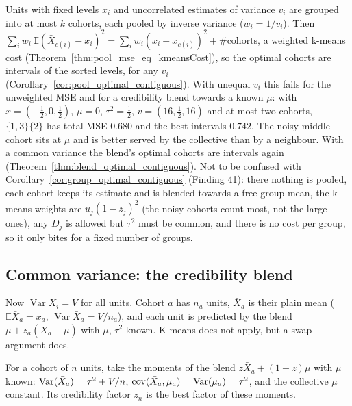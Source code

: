 \begin{remark}\label{rem:kmeans_bridge}
  Units with fixed levels $x_i$ and uncorrelated estimates of variance $v_i$
  are grouped into at most $k$ cohorts, each pooled by inverse variance
  ($w_i = 1/v_i$). Then
  $\sum_i w_i\,\mathbb E(\bar X_{c(i)} - x_i)^2
  = \sum_i w_i (x_i - \bar x_{c(i)})^2 + \#\text{cohorts}$, a weighted
  k-means cost (Theorem~\ref{thm:pool_mse_eq_kmeansCost}), so the optimal cohorts
  are intervals of the sorted levels, for any $v_i$
  (Corollary~\ref{cor:pool_optimal_contiguous}).
  With unequal $v_i$ this fails for the unweighted MSE and for a credibility
  blend towards a known $\mu$: with $x = (-\tfrac12, 0, \tfrac12)$, $\mu = 0$,
  $\tau^2 = \tfrac12$, $v = (16, \tfrac12, 16)$ and at most two cohorts,
  $\{1,3\}\{2\}$ has total MSE $0.680$ and the best intervals $0.742$. The
  noisy middle cohort sits at $\mu$ and is better served by the collective
  than by a neighbour. With a common variance the blend's optimal cohorts are
  intervals again (Theorem~\ref{thm:blend_optimal_contiguous}).
  Not to be confused with Corollary~\ref{cor:group_optimal_contiguous} (Finding 41): there nothing
  is pooled, each cohort keeps its estimate and is blended towards a free group mean, the k-means
  weights are $u_j(1-z_j)^2$ (the noisy cohorts count most, not the large ones), any $D_j$ is
  allowed but $\tau^2$ must be common, and there is no cost per group, so it only bites for a fixed
  number of groups.
\end{remark}

\subsection{Common variance: the credibility blend}

Now $\operatorname{Var} X_i = V$ for all units. Cohort $a$ has $n_a$ units,
$\bar X_a$ is their plain mean ($\mathbb E \bar X_a = \bar x_a$,
$\operatorname{Var} \bar X_a = V/n_a$), and each unit is predicted by the
blend $\mu + z_a(\bar X_a - \mu)$ with $\mu$, $\tau^2$ known. K-means does
not apply, but a swap argument does.

\begin{definition}\label{def:sizeZ}
  \leanok
  For a cohort of $n$ units, take the moments of the blend
  $z\bar X_a + (1-z)\mu$ with $\mu$ known: $\operatorname{Var}(\bar X_a) = \tau^2 + V/n$,
  $\operatorname{cov}(\bar X_a, \mu_a) = \operatorname{Var}(\mu_a) = \tau^2$, and the collective $\mu$
  constant. Its credibility factor $z_n$ is the best factor  of
  these moments.
\end{definition}

